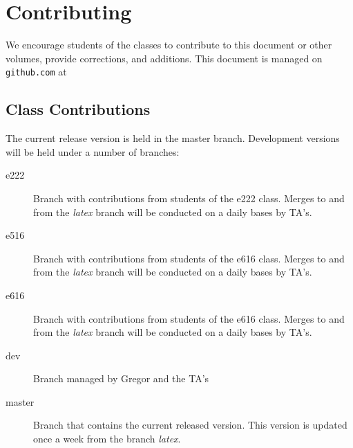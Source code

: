 






\section{Contributing}

We encourage students of the classes to contribute to this document or
other volumes, provide corrections, and additions. This document is
managed on \verb|github.com| at


\subsection{Class Contributions}

The current release version is held in the master branch.
Development versions will be held under a number of branches:

\begin{description}
\item[e222] Branch with contributions from students of the e222
  class. Merges to and from the {\em latex} branch will be conducted
  on a daily bases by TA's.
\item[e516] Branch with contributions from students of the e616
  class. Merges to and from the {\em latex} branch will be conducted
  on a daily bases by TA's.
\item[e616] Branch with contributions from students of the e616
  class. Merges to and from the {\em latex} branch will be conducted
  on a daily bases by TA's.
\item[dev] Branch managed by Gregor and the TA's
\item[master] Branch that contains the current released version. This
  version is updated once a week from the branch {\em latex}.
\end{description}

